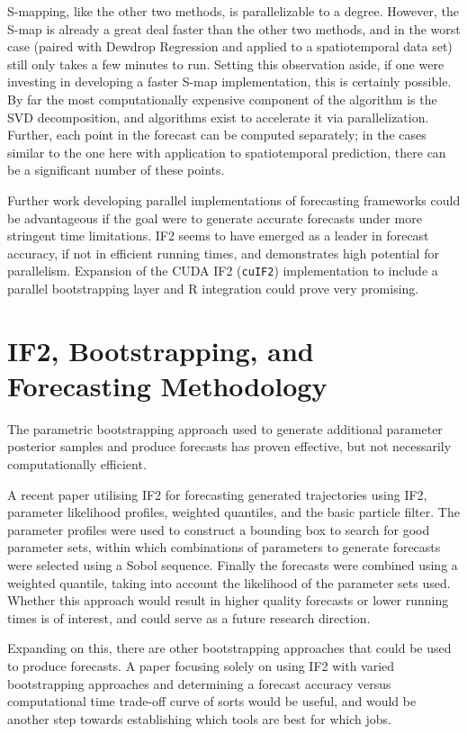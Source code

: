	S-mapping, like the other two methods, is parallelizable to a degree. However, the S-map is already a great deal faster than the other two methods, and in the worst case (paired with Dewdrop Regression and applied to a spatiotemporal data set) still only takes a few minutes to run. Setting this observation aside, if one were investing in developing a faster S-map implementation, this is certainly possible. By far the most computationally expensive component of the algorithm is the SVD decomposition, and algorithms exist to accelerate it via parallelization. Further, each point in the forecast can be computed separately; in the cases similar to the one here with application to spatiotemporal prediction, there can be a significant number of these points.

	Further work developing parallel implementations of forecasting frameworks could be advantageous if the goal were to generate accurate forecasts under more stringent time limitations. IF2 seems to have emerged as a leader in forecast accuracy, if not in efficient running times, and demonstrates high potential for parallelism. Expansion of the CUDA IF2 (\texttt{cuIF2}) implementation to include a parallel bootstrapping layer and R integration could prove very promising.


\section{IF2, Bootstrapping, and Forecasting Methodology}

	The parametric bootstrapping approach used to generate additional parameter posterior samples and produce forecasts has proven effective, but not necessarily computationally efficient.

	A recent paper utilising IF2 for forecasting \cite{King2015} generated trajectories using IF2, parameter likelihood profiles, weighted quantiles, and the basic particle filter. The parameter profiles were used to construct a bounding box to search for good parameter sets, within which combinations of parameters to generate forecasts were selected using a Sobol sequence. Finally the forecasts were combined using a weighted quantile, taking into account the likelihood of the parameter sets used. Whether this approach would result in higher quality forecasts or lower running times is of interest, and could serve as a future research direction. 

	Expanding on this, there are other bootstrapping approaches that could be used to produce forecasts. A paper focusing solely on using IF2 with varied bootstrapping approaches and determining a forecast accuracy versus computational time trade-off curve of sorts would be useful, and would be another step towards establishing which tools are best for which jobs.


